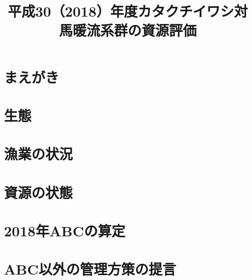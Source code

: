 \documentclass{jsarticle}
\title{平成30（2018）年度カタクチイワシ対馬暖流系群の資源評価}
\author{}
\date{}
\begin{document}
\maketitle
\section{まえがき}
\section{生態}
\section{漁業の状況}
\section{資源の状態}
\section{2018年ABCの算定}
\section{ABC以外の管理方策の提言}
\end{document}
